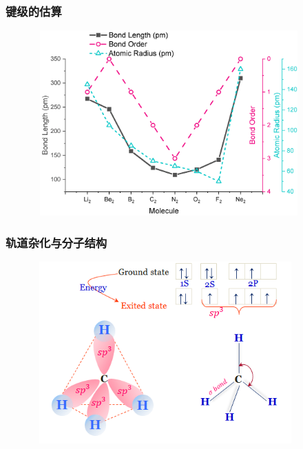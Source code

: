 {\frame
{
	\frametitle{键级的估算}
\begin{figure}[h!]
\centering
\vspace{-15.5pt}
\includegraphics[height=2.80in,width=4.10in,viewport=0 0 800 550,clip]{Figures/Band-order-2.jpg}
\label{Bond_Order-2}
\end{figure}
}

\frame
{
	\frametitle{轨道杂化与分子结构}
\begin{figure}[h!]
\centering
\vspace{-10.5pt}
\includegraphics[height=2.75in,width=4.00in,viewport=0 0 520 370,clip]{Figures/methane-gas.png}
\label{Bond_Hybrid}
\end{figure}
}

}

